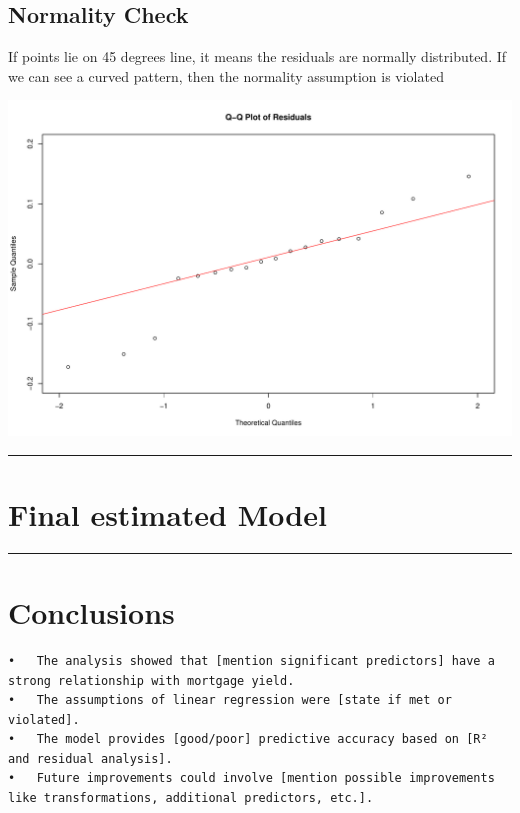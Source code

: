\documentclass[
  11pt,
]{article}
\begin{document}
\subsection{Normality Check}\label{normality-check}

If points lie on 45 degrees line, it means the residuals are normally
distributed. If we can see a curved pattern, then the normality
assumption is violated

\includegraphics{Figs/unnamed-chunk-18-1.pdf}

\begin{center}\rule{0.5\linewidth}{0.5pt}\end{center}

\section{Final estimated Model}\label{final-estimated-model}

\begin{center}\rule{0.5\linewidth}{0.5pt}\end{center}

\section{Conclusions}\label{conclusions}

\begin{verbatim}
•   The analysis showed that [mention significant predictors] have a strong relationship with mortgage yield.
•   The assumptions of linear regression were [state if met or violated].
•   The model provides [good/poor] predictive accuracy based on [R² and residual analysis].
•   Future improvements could involve [mention possible improvements like transformations, additional predictors, etc.].
\end{verbatim}
\end{document}
